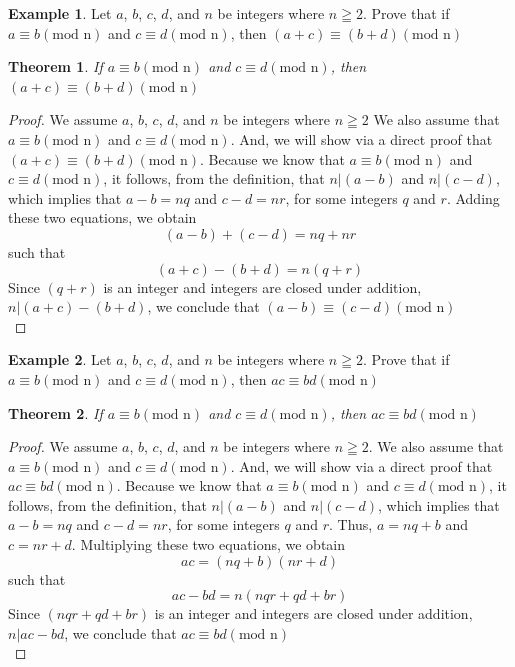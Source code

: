 \documentclass{book}
\newtheorem{theorem}{Theorem}[section]
\theoremstyle{definition}
\newtheorem{example}{Example}[definition]
\theoremstyle{remark}
\begin{document}
\begin{example}
Let $a$, $b$, $c$, $d$, and $n$ be integers where $n \geqq 2$. Prove that if $a \equiv b (\text{mod n})$ and $c \equiv d (\text{mod n})$, then $ (a + c) \equiv (b + d) (\text{mod n})$

\begin{tcolorbox}
	\begin{theorem}
		If $a \equiv b (\text{mod n})$ and $c \equiv d (\text{mod n})$, then $(a + c) \equiv (b + d) (\text{mod n})$
	\end{theorem}
\end{tcolorbox}

\begin{proof}
We assume $a$, $b$, $c$, $d$, and $n$ be integers where $n \geqq 2$ We also assume that $a \equiv b (\text{mod n})$ and $c \equiv d (\text{mod n})$. And, we will show via a direct proof that $(a + c) \equiv (b + d) (\text{mod n})$. Because we know that $a \equiv b (\text{mod n})$ and $c \equiv d (\text{mod n})$, it follows, from the definition, that   $n | (a-b)$ and $n | (c-d)$, which implies that $a-b = nq$ and $c-d = nr$, for some integers $q$ and $r$. Adding these two equations, we obtain \[ (a-b) + (c-d) = nq + nr \]such that \[ (a+c) - (b+d) = n(q + r) \] 
Since $(q + r)$ is an integer and integers are closed under addition, $n | (a+c) - (b+d)$, we conclude that $(a-b) \equiv (c-d) (\text{mod n})$ \\
\end{proof}
\end{example}


\begin{example}
Let $a$, $b$, $c$, $d$, and $n$ be integers where $n \geqq 2$. Prove that if $a \equiv b (\text{mod n})$ and $c \equiv d (\text{mod n})$, then $ ac \equiv bd (\text{mod n})$

\begin{tcolorbox}
	\begin{theorem}
		 If $a \equiv b (\text{mod n})$ and $c \equiv d (\text{mod n})$, then $ ac \equiv bd (\text{mod n})$
	\end{theorem}
\end{tcolorbox}

\begin{proof}
We assume $a$, $b$, $c$, $d$, and $n$ be integers where $n \geqq 2$.  We also assume that $a \equiv b (\text{mod n})$ and $c \equiv d (\text{mod n})$. And, we will show via a direct proof that $ac \equiv bd (\text{mod n})$. Because we know that $a \equiv b (\text{mod n})$ and $c \equiv d (\text{mod n})$, it follows, from the definition, that   $n | (a-b)$ and $n | (c-d)$, which implies that $a-b = nq$ and $c-d = nr$, for some integers $q$ and $r$. Thus, $a = nq + b$ and $c = nr + d$. Multiplying these two equations, we obtain \[ ac = (nq + b)(nr + d) \] such that \[ ac - bd = n(nqr + qd + br) \] 
Since $(nqr + qd + br)$ is an integer and integers are closed under addition, $n | ac - bd$, we conclude that $ac \equiv bd (\text{mod n})$ \\
\end{proof}
\end{example}
\end{document}
